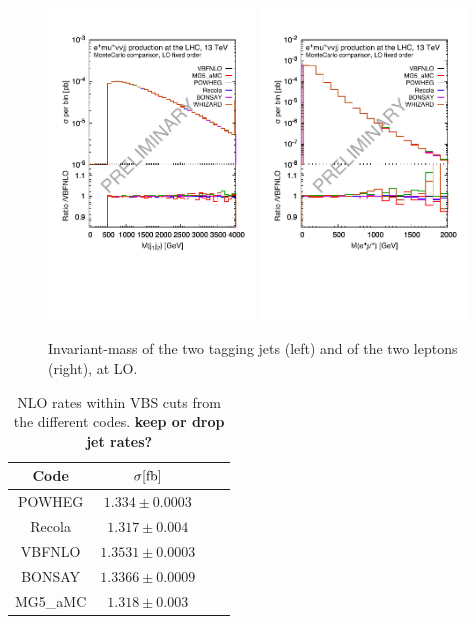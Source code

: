 \begin{figure}[h!]
   \centering
   \includegraphics[width=0.49\textwidth,angle=0,clip=true,trim={0.4cm 2.5cm 0.cm 1.cm}]{figures/mjj_LO.pdf}
   \includegraphics[width=0.49\textwidth,angle=0,clip=true,trim={0.4cm 2.5cm 0.cm 1.cm}]{figures/mll_LO.pdf}
\caption{\label{fig:wg1_mjj-llLO}Invariant-mass of the two tagging jets (left) and of the two leptons (right), at LO.
}
\end{figure}
%
\begin{table}[h!]
    \centering
    \begin{tabular}{c|c|c|c}
        Code  &  $\sigma[\rm{fb}]$  \\
        \hline
        \hline
        {\sc POWHEG}  &  $1.334 \pm 0.0003$  \\
        {\sc Recola}\+{\sc MoCaNLO}  &  $1.317 \pm 0.004 $ \\
        {\sc VBFNLO}  &  $1.3531 \pm 0.0003$  \\
        {\sc BONSAY}  &  $1.3366 \pm 0.0009$  \\
        {\sc MG5\_aMC}&  $1.318  \pm 0.003$  \\
    \end{tabular}
    \caption{\label{tab:wg1_NLOrates} NLO rates within VBS cuts from the different codes. {\bf keep or drop jet rates?}}
\end{table}
